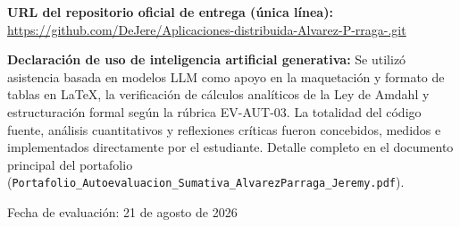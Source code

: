 \documentclass[11pt,a4paper]{article}
\begin{document}
\vspace{1.0cm}
\begin{center}
\textbf{URL del repositorio oficial de entrega (\'unica l\'inea):}\\[0.3cm]
\url{https://github.com/DeJere/Aplicaciones-distribuida-Alvarez-P-rraga-.git}
\end{center}

\vspace{1.0cm}
\noindent\textbf{Declaraci\'on de uso de inteligencia artificial generativa:} Se utiliz\'o
asistencia basada en modelos LLM como apoyo en la maquetaci\'on y formato de tablas en \LaTeX,
la verificaci\'on de c\'alculos anal\'iticos de la Ley de Amdahl y estructuraci\'on formal seg\'un
la r\'ubrica EV-AUT-03. La totalidad del c\'odigo fuente, an\'alisis cuantitativos y reflexiones cr\'iticas
fueron concebidos, medidos e implementados directamente por el estudiante. Detalle completo en el
documento principal del portafolio (\texttt{Portafolio\_Autoevaluacion\_Sumativa\_AlvarezParraga\_Jeremy.pdf}).

\vfill
\begin{center}
\small Fecha de evaluaci\'on: 21 de agosto de 2026
\end{center}
\end{document}

